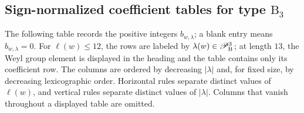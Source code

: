 \documentclass[a4paper]{amsart}
\theoremstyle{remark}
\numberwithin{equation}{section}
\begin{document}
\subsection{Sign-normalized coefficient tables for type $\mathrm{B}_3$}
The following table records the positive integers $b_{w,\lambda}$; a blank entry means
$b_{w,\lambda}=0$. For $\ell(w)\leq 12$, the rows are labeled by $\lambda(w)\in \mathscr{P}^3_{\mathrm{B}_{}}$; at length $13$, the Weyl
group element is displayed in the heading and the table contains only its
coefficient row. The columns are ordered by decreasing $|\lambda|$ and,
for fixed size, by decreasing lexicographic order. Horizontal rules separate
distinct values of $\ell(w)$, and vertical rules separate distinct values of
$|\lambda|$. Columns that vanish throughout a displayed table are omitted.
\par\medskip
\end{document}
